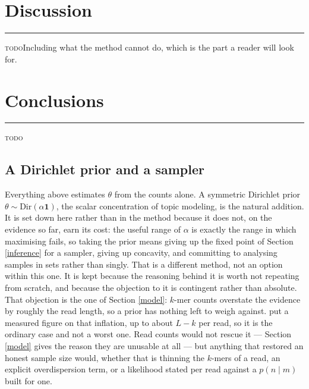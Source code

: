 \documentclass[pdflatex,sn-vancouver-num]{sn-jnl}
\newif\ifshowtodos \showtodostrue
\newcommand{\todo}[1]{%
  \ifshowtodos
    \par\addvspace{0.7\baselineskip}%
    \begin{list}{}{%
      \setlength{\leftmargin}{1.5em}%
      \setlength{\rightmargin}{1.5em}%
      \setlength{\topsep}{0pt}%
      \setlength{\partopsep}{0pt}%
      \setlength{\parsep}{0.5\baselineskip}%
      \setlength{\itemsep}{0pt}%
    }%
    \item[]\footnotesize\color{black!70}%
      \textcolor{orange!65!black}{\rule[-0.2ex]{2pt}{1.15ex}}\hspace{0.55em}%
      \textcolor{orange!65!black}{\textsc{todo}}\hspace{0.6em}\ignorespaces#1%
    \end{list}%
    \addvspace{0.7\baselineskip}%
  \fi%
}
\begin{document}
    \section{Discussion}\label{discussion}
    \todo{Including what the method cannot do, which is the part a reader will look for.}

    \section{Conclusions}\label{conclusions}
    \todo{}

    \begin{appendices}

    \section{A Dirichlet prior and a sampler}\label{prior}
    Everything above estimates $\theta$ from the counts alone. A symmetric Dirichlet prior
    $\theta \sim \mathrm{Dir}(\alpha \mathbf{1})$, the scalar concentration of topic modeling, is the
    natural addition. It is set down here rather than in the method
    because it does not, on the evidence so far, earn its cost: the useful range of $\alpha$ is
    exactly the range in which maximising fails, so taking the prior means giving up the fixed point
    of Section \ref{inference} for a sampler, giving up concavity, and committing to analysing
    samples in sets rather than singly. That is a different method, not an option within this one.
    It is kept because the reasoning behind it is worth not repeating from scratch, and because the
    objection to it is contingent rather than absolute. That objection is the one of
    Section \ref{model}: $k$-mer counts overstate the evidence by roughly the read length, so a prior
    has nothing left to weigh against. \citet{krakenuniq} put a measured figure on that inflation, up
    to about $L - k$ per read, so it is the ordinary case and not a worst one. Read counts would not
    rescue it --- Section \ref{model} gives
    the reason they are unusable at all --- but anything that restored an honest sample size would,
    whether that is thinning the $k$-mers of a read, an explicit overdispersion term, or a likelihood
    stated per read against a $p(n \mid m)$ built for one.


\end{appendices}
\end{document}
